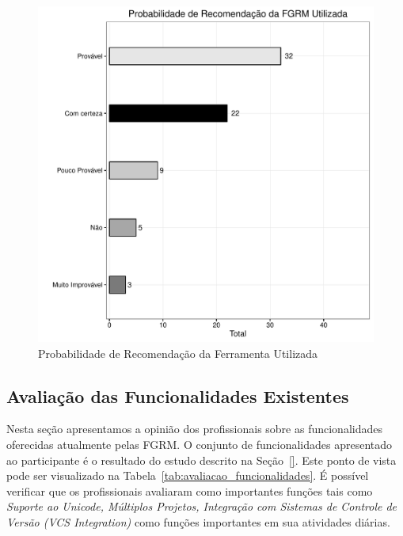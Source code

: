 \begin{figure}[htpb]
	\centering
	\includegraphics[width=0.8\linewidth]{./chapter-pesquisa-com-profissionais/img/grafico_melhorias_fgrm_probabilidade_recomentacao.pdf}
	\caption{Probabilidade de Recomendação da Ferramenta Utilizada}
\label{fig:grafico_melhorias_fgrm_probabilidade_recomentacao}
\end{figure}

\subsection{Avaliação das Funcionalidades Existentes}
\label{sub:avaliação_das_funcionalidades_existentes}

Nesta seção apresentamos a opinião dos profissionais sobre as funcionalidades
oferecidas atualmente pelas FGRM\@. O conjunto de funcionalidades apresentado ao
participante é o resultado do estudo descrito na Seção~\ref{}. Este ponto de
vista pode ser visualizado na Tabela~\ref{tab:avaliacao_funcionalidades}. É
possível verificar que os profissionais avaliaram como importantes funções tais
como \textit{Suporte ao Unicode, Múltiplos Projetos, Integração com Sistemas de
	Controle de Versão (VCS Integration)} como  funções importantes em sua
atividades diárias.

